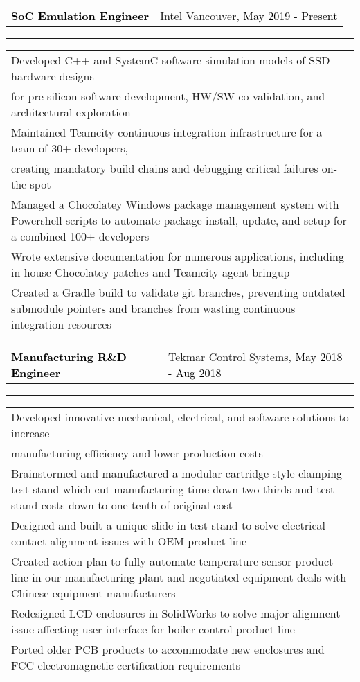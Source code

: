 \documentclass[10pt,letterpaper]{article}
\newcommand{\mpwidth}{\linewidth-\fboxsep-\fboxsep}
\newcommand{\tzlarrow}{(0,0) -- (0.2,0) -- (0.3,0.2) -- (0.2,0.4) -- (0,0.4) -- (0.1,0.2) -- cycle;}
\newcommand{\larrow}[1]
{\begin{tikzpicture}[scale=0.58]
	 \filldraw[fill=#1!100,draw=#1!100!black]  \tzlarrow
 \end{tikzpicture}
}
\newcommand{\cvbigevent}[9]
{
\vspace{8pt}
	\begin{tabular*}{0.2\mpwidth}{p{0.4\mpwidth}  x{0.575\mpwidth}}
 	\textcolor{black}{\textbf{#2}} & \textcolor{complcol}{#3}, \textcolor{black}{#1} 

	\end{tabular*}
\vspace{-12pt}
\textcolor{softcol}{\hrule}
\vspace{6pt}
	\begin{tabular*}{0.5\mpwidth}{p{\mpwidth}}
\larrow{softcol}  #4\\[6pt]
\larrow{softcol}  #5\\[6pt]
\larrow{softcol}  #6\\[6pt]
\larrow{softcol}  #7\\[6pt]
\larrow{softcol}  #8\\[6pt]
\larrow{softcol}  #9\\[6pt]
	\end{tabular*}

}
\newcommand{\cvIntelEvent}[8]
{
\vspace{8pt}
	\begin{tabular*}{0.2\mpwidth}{p{0.4\mpwidth}  x{0.575\mpwidth}}
 	\textcolor{black}{\textbf{#2}} & \textcolor{complcol}{#3}, \textcolor{black}{#1} 

	\end{tabular*}
\vspace{-12pt}
\textcolor{softcol}{\hrule}
\vspace{6pt}
	\begin{tabular*}{0.5\mpwidth}{p{\mpwidth}}
\larrow{softcol}  #4\\[6pt]
\larrow{softcol}  #5\\[6pt]
\larrow{softcol}  #6\\[6pt]
\larrow{softcol}  #7\\[6pt]
\larrow{softcol}  #8\\[6pt]
	\end{tabular*}

}
\begin{document}
{\begin{minipage}[c][0.95\textheight][t]{0.69\linewidth}
\cvIntelEvent{May 2019 - Present}{SoC Emulation Engineer}{\href{http://www.intel.com}{Intel Vancouver}}{Developed C++ and SystemC software simulation models of SSD hardware designs \\for pre-silicon software development, HW/SW co-validation,
and architectural exploration}{Maintained Teamcity continuous integration infrastructure for a team of 30+ developers, \\creating mandatory build chains and debugging critical failures on-the-spot}{Managed a Chocolatey Windows package management system with Powershell scripts to automate package install, update, and setup for a combined 100+ developers}{Wrote extensive documentation for numerous applications, including in-house Chocolatey patches and Teamcity agent bringup}{Created a Gradle build to validate git branches, preventing outdated submodule pointers and branches from wasting continuous integration resources}
\cvbigevent{May 2018 - Aug 2018}{Manufacturing R\&D Engineer}{\href{http://www.tekmarcontrols.com/}{Tekmar Control Systems}}{Developed innovative mechanical, electrical, and software solutions to increase \\manufacturing efficiency and lower production costs}{Brainstormed and manufactured a modular cartridge style clamping test stand which cut manufacturing time down two-thirds and test stand costs down to one-tenth of original cost}{Designed and built a unique slide-in test stand to solve electrical contact alignment issues with OEM product line}{Created action plan to fully automate temperature sensor product line in our manufacturing plant and negotiated equipment deals with Chinese equipment manufacturers}{Redesigned LCD enclosures in SolidWorks to solve major alignment issue affecting user interface for boiler control product line}{Ported older PCB products to accommodate new enclosures and FCC electromagnetic certification requirements}






\end{minipage}}
\end{document}
